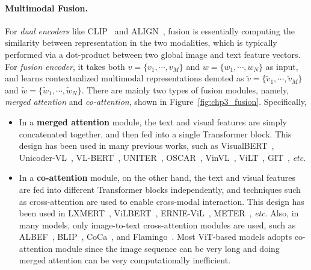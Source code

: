 \paragraph{Multimodal Fusion.} 
For \emph{dual encoders} like CLIP~\citep{radford2021learning} and ALIGN~\citep{jia2021scaling}, fusion is essentially computing the similarity between representation in the two modalities, which is typically performed via a dot-product between two global image and text feature vectors.
For \emph{fusion encoder}, it takes both $v=\{ v_1, \cdots, v_M\}$ and $w=\{ w_1, \cdots, w_N\}$ as input, and learns contextualized multimodal representations denoted as $\tilde{v}=\{ \tilde{v}_1, \cdots, \tilde{v}_M\}$ and $\tilde{w}=\{ \tilde{w}_1, \cdots, \tilde{w}_N\}$. There are mainly two types of fusion modules, namely, \textit{merged attention} and \textit{co-attention}, shown in Figure~\ref{fig:chp3_fusion}. Specifically,
\begin{itemize}[leftmargin=*]
    \item In a \textbf{merged attention} module, the text and visual features are simply concatenated together, and then fed into a single Transformer block. This design has been used in many previous works, such as VisualBERT~\citep{li2019visualbert}, Unicoder-VL~\citep{li2020unicoder}, VL-BERT~\citep{su2019vl}, UNITER~\citep{chen2020uniter}, OSCAR~\citep{li2020oscar}, VinVL~\citep{zhang2021vinvl}, ViLT~\citep{kim2021vilt}, GIT~\citep{wang2022git}, \emph{etc}. %
    \item In a \textbf{co-attention} module, on the other hand, the text and visual features are fed into different Transformer blocks independently, and techniques such as cross-attention are used to enable cross-modal interaction. This design has been used in LXMERT~\citep{tan-bansal-2019-lxmert}, ViLBERT~\citep{lu2019vilbert}, ERNIE-ViL~\citep{yu2021ernie}, METER~\citep{dou2021empirical}, \emph{etc}. Also, in many models, only image-to-text cross-attention modules are used, such as ALBEF~\citep{li2021align}, BLIP~\citep{li2022blip}, CoCa~\citep{yu2022coca}, and  Flamingo~\citep{alayrac2022flamingo}. Most ViT-based models adopts co-attention module since the image sequence can be very long and doing merged attention can be very computationally inefficient.
\end{itemize}



